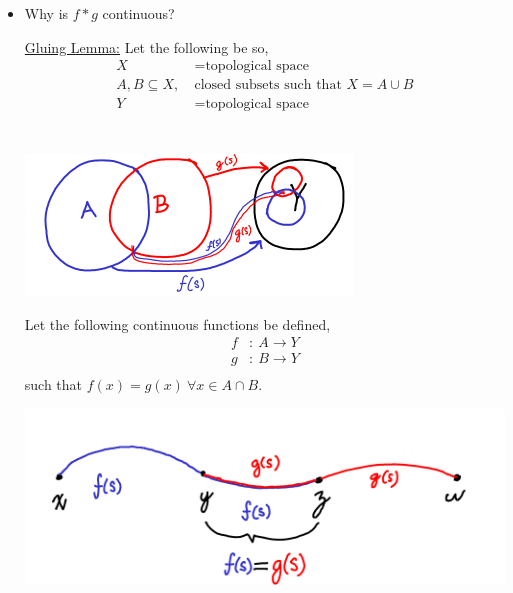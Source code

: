     \begin{itemize}
        \item Why is $f*g$ continuous?\\
        \begin{theorem}
            \underline{Gluing Lemma:} Let the following be so,
            \begin{align*}
                X &= \text{topological space}\\
                A,B \subseteq X,\ &\text{closed subsets such that } X=A\cup B\\
                Y &= \text{topological space}\\
            \end{align*}\\
                \begin{minipage}[c]{\linewidth}
                    \begin{center}
                    \includegraphics[]{images/gluing_lemma_2.png}
                    \end{center}
                \end{minipage}
            Let the following continuous functions be defined,
            \begin{align*}
                f&:\ A \rightarrow Y\\
                g&:\ B \rightarrow Y\\
            \end{align*}
            such that $f(x)=g(x)\ \forall x \in A\cap B$.\\
                        \begin{minipage}[c]{\linewidth}
                            \begin{center}
                            \includegraphics[]{images/gluing_lemma.png}

\end{center}
\end{minipage}
\end{theorem}
\end{itemize}
